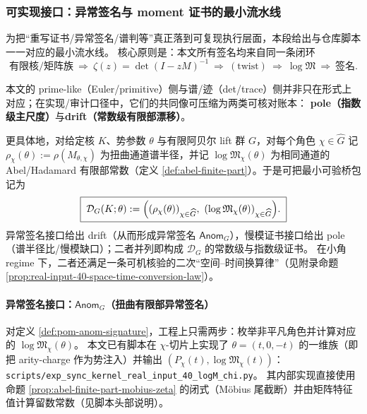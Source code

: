 \subsubsection{可实现接口：异常签名与 moment 证书的最小流水线}\label{subsec:pom-implementable-interfaces}

为把“重写证书/异常签名/谱判等”真正落到可复现执行层面，本段给出与仓库脚本一一对应的最小流水线。
核心原则是：本文所有签名均来自同一条闭环
$$
\text{有限核/矩阵族}\ \Longrightarrow\ \zeta(z)=\det(I-zM)^{-1}\ \Longrightarrow\ (\text{twist})\ \Longrightarrow\ \log\mathfrak{M}\ \Longrightarrow\ \text{签名}.
$$

\begin{remark}\label{rem:pom-pole-drift-bridgepack}
本文的 prime-like（Euler/primitive）侧与谱/迹（det/trace）侧并非只在形式上对应；在实现/审计口径中，它们的共同像可压缩为两类可核对账本：
\textbf{pole（指数级主尺度）}与\textbf{drift（常数级有限部漂移）}。
\par
更具体地，对给定核 \(K\)、势参数 \(\theta\) 与有限阿贝尔 lift 群 \(G\)，对每个角色 \(\chi\in\widehat G\) 记 \(\rho_\chi(\theta):=\rho(M_{\theta,\chi})\) 为扭曲通道谱半径，并记 \(\log\mathfrak{M}_\chi(\theta)\) 为相同通道的 Abel/Hadamard 有限部常数（定义 \ref{def:abel-finite-part}）。于是可把最小可验桥包记为
\[
\boxed{\;
\mathcal{D}_G(K;\theta):=\Bigl((\rho_\chi(\theta))_{\chi\in\widehat G},\ (\log\mathfrak{M}_\chi(\theta))_{\chi\in\widehat G}\Bigr).\;}
\]
异常签名接口给出 drift（从而形成异常签名 \(\mathsf{Anom}_G\)），慢模证书接口给出 pole（谱半径比/慢模缺口）；二者并列即构成 \(\mathcal{D}_G\) 的常数级与指数级证书。
在小角 regime 下，二者还满足一条可机核验的二次“空间--时间换算律”（见附录命题 \ref{prop:real-input-40-space-time-conversion-law}）。
\end{remark}

\paragraph{异常签名接口：\texorpdfstring{$\mathsf{Anom}_G$}{Anom}（扭曲有限部异常签名）}
对定义 \ref{def:pom-anom-signature}，工程上只需两步：枚举非平凡角色并计算对应的 \(\log\mathfrak{M}_\chi(\theta)\)。
本文已有脚本在 \(\chi\)-切片上实现了 \(\theta=(t,0,-t)\) 的一维族（即把 arity-charge 作为势注入）并输出 \((P_\chi(t),\log\mathfrak{M}_\chi(t))\)：
\texttt{scripts/exp\_sync\_kernel\_real\_input\_40\_logM\_chi.py}。
其内部实现直接使用命题 \ref{prop:abel-finite-part-mobius-zeta} 的闭式（Möbius 尾截断）并由矩阵特征值计算留数常数（见脚本头部说明）。

